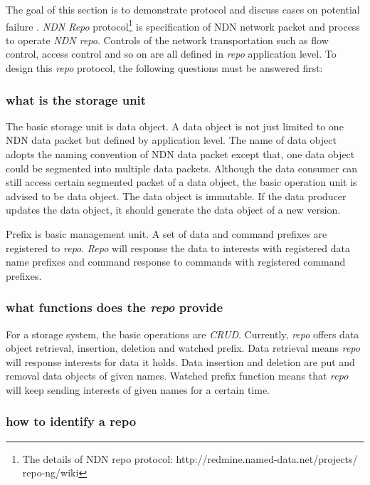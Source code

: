 \documentclass[conference]{IEEEtran}
\begin{document}
The goal of this section is to demonstrate protocol and discuss cases on potential failure . \emph{NDN Repo} protocol\footnote{The details of NDN repo protocol: http://redmine.named-data.net/projects/
repo-ng/wiki} is specification of NDN network packet and process to operate \emph{NDN repo}. Controls of the network transportation such as flow control, access control and so on are all defined in \emph{repo} application level. To design this \emph{repo} protocol, the following questions must be answered first:

\subsubsection{what is the storage unit}

The basic storage unit is data object. A data object is not just limited to one NDN data packet but defined by application level. The name of data object adopts the naming convention of NDN data packet except that, one data object could be segmented into multiple data packets. Although the data consumer can still access certain segmented packet of a data object, the basic operation unit is advised to be data object. The data object is immutable. If the data producer updates the data object, it should generate the data object of a new version.

Prefix is basic management unit. A set of data and command prefixes are registered to \emph{repo}. \emph{Repo} will response the data to interests with registered data name prefixes and command response to commands with registered command prefixes.

\subsubsection{what functions does the \emph{repo} provide}

For a storage system, the basic operations are \emph{CRUD}. Currently, \emph{repo} offers data object retrieval, insertion, deletion and watched prefix. Data retrieval means \emph{repo} will response interests for data it holds. Data insertion and deletion are put and removal data objects of given names. Watched prefix function means that \emph{repo} will keep sending interests of given names for a certain time.

\subsubsection{how to identify a repo}
\end{document}
